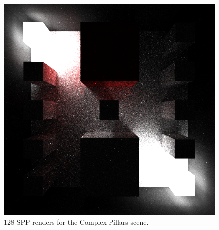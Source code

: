 \documentclass[ %
                    author={Callum Pearce},
                supervisor={Dr. Neill Campbell},
                    degree={MEng},
                     title={Learning the incident radiance for a continuous state space rather than a discrete one is more beneficial for Importance Sampling in Monte Carlo Path Tracing},
                  subtitle={},
                      type={research},
                      year={2019} ]{dissertation}
\begin{document}
\begin{figure}[h]
\endminipage\hspace{1em}
  \includegraphics[width=\textwidth]{images/renders/complex_pillars/nn.png}
\endminipage
\caption{128 SPP renders for the Complex Pillars scene.}
\label{fig:complex_light}
\end{figure}
\end{document}
